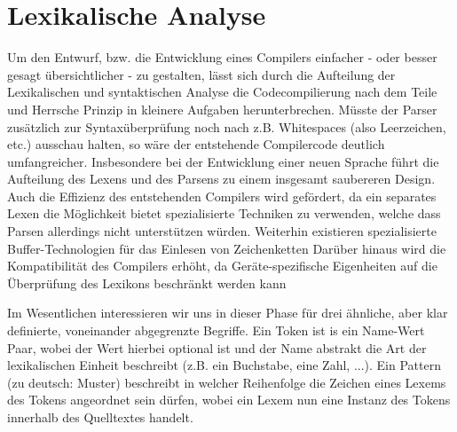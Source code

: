 \documentclass{standalone}
\begin{document}


\chapter{Lexikalische Analyse}
Um den Entwurf, bzw. die Entwicklung eines Compilers einfacher - oder besser gesagt übersichtlicher - zu gestalten, lässt sich durch die Aufteilung der Lexikalischen und syntaktischen Analyse die Codecompilierung nach dem Teile und Herrsche Prinzip in kleinere Aufgaben herunterbrechen.
Müsste der Parser zusätzlich zur Syntaxüberprüfung noch nach z.B. Whitespaces (also Leerzeichen, etc.) ausschau halten, so wäre der entstehende Compilercode deutlich umfangreicher. Insbesondere bei der Entwicklung einer neuen Sprache führt die Aufteilung des Lexens und des Parsens zu einem insgesamt saubereren Design. 
Auch die Effizienz des entstehenden Compilers wird gefördert, da ein separates Lexen die Möglichkeit bietet spezialisierte Techniken zu verwenden, welche dass Parsen allerdings nicht unterstützen würden. Weiterhin existieren spezialisierte Buffer-Technologien für das Einlesen von Zeichenketten %
Darüber hinaus wird die Kompatibilität  des Compilers erhöht, da Geräte-spezifische Eigenheiten auf die Überprüfung des Lexikons beschränkt werden kann %
\par

Im Wesentlichen interessieren wir uns in dieser Phase für drei ähnliche, aber klar definierte, voneinander abgegrenzte Begriffe. Ein Token ist is ein Name-Wert Paar, wobei der Wert hierbei optional ist und der Name abstrakt die Art der lexikalischen Einheit beschreibt (z.B. ein Buchstabe, eine Zahl, ...). Ein Pattern (zu deutsch: Muster) beschreibt in welcher Reihenfolge die Zeichen eines Lexems des Tokens angeordnet sein dürfen, wobei ein Lexem nun eine Instanz des Tokens innerhalb des Quelltextes handelt. 


\end{document}
